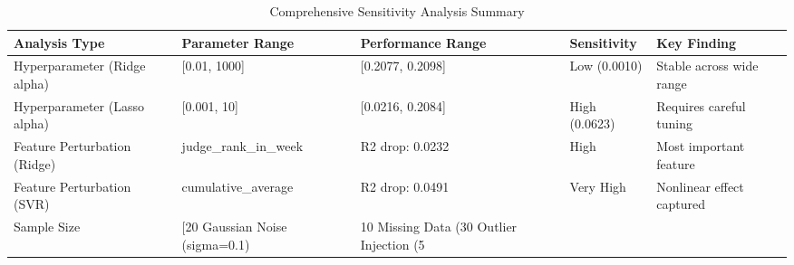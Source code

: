 
\begin{table}[h]
\centering
\caption{Comprehensive Sensitivity Analysis Summary}
\label{tab:sensitivity_summary}
\begin{tabular}{lllll}
\toprule
\textbf{Analysis Type} & \textbf{Parameter Range} & \textbf{Performance Range} & \textbf{Sensitivity} & \textbf{Key Finding} \\
\midrule
Hyperparameter (Ridge alpha) & [0.01, 1000] & [0.2077, 0.2098] & Low (0.0010) & Stable across wide range \\
Hyperparameter (Lasso alpha) & [0.001, 10] & [0.0216, 0.2084] & High (0.0623) & Requires careful tuning \\
Feature Perturbation (Ridge) & judge_rank_in_week & R2 drop: 0.0232 & High & Most important feature \\
Feature Perturbation (SVR) & cumulative_average & R2 drop: 0.0491 & Very High & Nonlinear effect captured \\
Sample Size & [20%
Gaussian Noise (sigma=0.1) & 10%
Missing Data (30%
Outlier Injection (5%
\bottomrule
\end{tabular}
\end{table}
